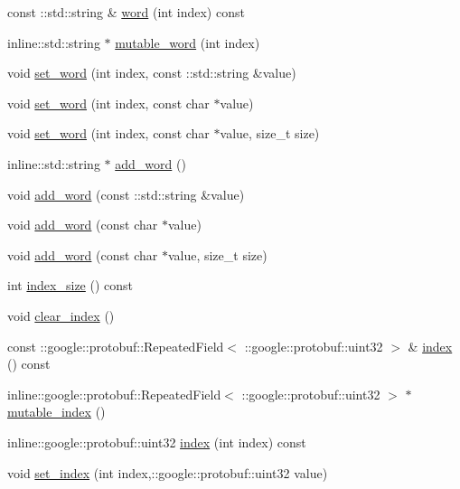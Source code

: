 \begin{DoxyCompactItemize}
\item 
const ::std::string \& \hyperlink{class_l_d_a_1_1word__ind__pair_a55bf7a00bb63ae558add53941e5b08e0}{word} (int index) const 
\item 
inline::std::string $\ast$ \hyperlink{class_l_d_a_1_1word__ind__pair_a28ace99ba274e58b4b5520975375b73b}{mutable\_\-word} (int index)
\item 
void \hyperlink{class_l_d_a_1_1word__ind__pair_a2fc3fdc684f33a6c8c4ef6f1d8de3400}{set\_\-word} (int index, const ::std::string \&value)
\item 
void \hyperlink{class_l_d_a_1_1word__ind__pair_ae4257eb3fbf2a14ab6c4037a4146f877}{set\_\-word} (int index, const char $\ast$value)
\item 
void \hyperlink{class_l_d_a_1_1word__ind__pair_a239007875834e3dc60e652d5f5cebccc}{set\_\-word} (int index, const char $\ast$value, size\_\-t size)
\item 
inline::std::string $\ast$ \hyperlink{class_l_d_a_1_1word__ind__pair_a7238422ac94bab72ddcdd25bbd4dd84a}{add\_\-word} ()
\item 
void \hyperlink{class_l_d_a_1_1word__ind__pair_a27765c940e36efd7836c879ff99febbb}{add\_\-word} (const ::std::string \&value)
\item 
void \hyperlink{class_l_d_a_1_1word__ind__pair_a25b0e19ff1b7e74131b6b19a7ddd9e39}{add\_\-word} (const char $\ast$value)
\item 
void \hyperlink{class_l_d_a_1_1word__ind__pair_abdfcb44dce9d365517d48d403e51e274}{add\_\-word} (const char $\ast$value, size\_\-t size)
\item 
int \hyperlink{class_l_d_a_1_1word__ind__pair_a2f15d45424493c3381d9de74858449a2}{index\_\-size} () const 
\item 
void \hyperlink{class_l_d_a_1_1word__ind__pair_a02ba71da4577bee96a8777575015da47}{clear\_\-index} ()
\item 
const ::google::protobuf::RepeatedField$<$ ::google::protobuf::uint32 $>$ \& \hyperlink{class_l_d_a_1_1word__ind__pair_a8a6b466c602c2f0ba788f0d63eaef8cb}{index} () const 
\item 
inline::google::protobuf::RepeatedField$<$ ::google::protobuf::uint32 $>$ $\ast$ \hyperlink{class_l_d_a_1_1word__ind__pair_a172a7eabc0a9639556467c29325161d9}{mutable\_\-index} ()
\item 
inline::google::protobuf::uint32 \hyperlink{class_l_d_a_1_1word__ind__pair_a367d992d06596d1962c68826a54cb9a2}{index} (int index) const 
\item 
void \hyperlink{class_l_d_a_1_1word__ind__pair_ab6c4d76c1d1ae047a73e81e7b1416adf}{set\_\-index} (int index,::google::protobuf::uint32 value)

\end{DoxyCompactItemize}
